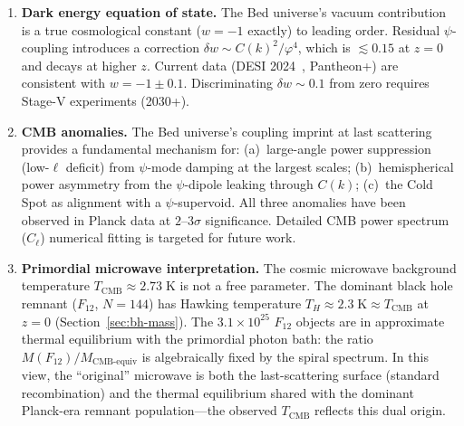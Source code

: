 \documentclass[12pt,a4paper]{article}
\newcommand{\bed}{Bed universe}
\begin{document}
\begin{enumerate}
\item \textbf{Dark energy equation of state.}\;  The \bed{}'s vacuum contribution is a true cosmological constant ($w = -1$ exactly) to leading order.  Residual $\psi$-coupling introduces a correction $\delta w \sim C(k)^2/\varphi^4$, which is $\lesssim 0.15$ at $z = 0$ and decays at higher $z$.  Current data (DESI 2024~\cite{DESI2024}, Pantheon+) are consistent with $w = -1 \pm 0.1$.  Discriminating $\delta w \sim 0.1$ from zero requires Stage-V experiments (2030+).

\item \textbf{CMB anomalies.}\;  The \bed{}'s coupling imprint at last scattering provides a fundamental mechanism for: (a)~large-angle power suppression (low-$\ell$ deficit) from $\psi$-mode damping at the largest scales; (b)~hemispherical power asymmetry from the $\psi$-dipole leaking through $C(k)$; (c)~the Cold Spot as alignment with a $\psi$-supervoid.  All three anomalies have been observed in Planck data at $2$--$3\sigma$ significance.  Detailed CMB power spectrum ($C_\ell$) numerical fitting is targeted for future work.

\item \textbf{Primordial microwave interpretation.}\;  The cosmic microwave background temperature $T_{\mathrm{CMB}} \approx 2.73\;\mathrm{K}$ is not a free parameter. The dominant black hole remnant ($F_{12}$, $N = 144$) has Hawking temperature $T_H \approx 2.3\;\mathrm{K} \approx T_{\mathrm{CMB}}$ at $z = 0$ (Section~\ref{sec:bh-mass}). The $3.1 \times 10^{25}$ $F_{12}$ objects are in approximate thermal equilibrium with the primordial photon bath: the ratio $M(F_{12})/M_{\mathrm{CMB\text{-}equiv}}$ is algebraically fixed by the spiral spectrum. In this view, the ``original'' microwave is both the last-scattering surface (standard recombination) and the thermal equilibrium shared with the dominant Planck-era remnant population---the observed $T_{\mathrm{CMB}}$ reflects this dual origin.


\end{enumerate}
\end{document}
